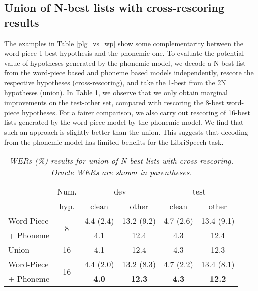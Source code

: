\documentclass[a4paper]{article}
\begin{document}
\subsection{Union of N-best lists with cross-rescoring results}
\vspace{-1mm}
The examples in Table \ref{plg_vs_wp} show some complementarity between the word-piece 1-best hypothesis
and the phonemic one.
To evaluate the potential value of hypotheses generated by the phonemic model, 
we decode a N-best list from the word-piece based and phoneme based models independently,
rescore the respective hypotheses (cross-rescoring), and take the 1-best from the 2N hypotheses (union).
In Table \ref{tab:union}, we observe that we only obtain marginal improvements on the test-other set, compared with rescoring the 8-best
word-piece hypotheses. For a fairer comparison, we also carry out rescoring of 16-best lists generated by
the word-piece model by the phonemic model. We find that such an approach is slightly better than the union.
This suggests that decoding from the phonemic model has limited benefits for the LibriSpeech task.
	\vspace{-1mm}
\begin{table}[h]
	\centering
	\setlength{\tabcolsep}{0.3em}
\vspace{-2mm}
	\caption{\it WERs (\%) results for union of N-best lists with
		cross-rescoring. Oracle WERs are shown in parentheses.}
	\vspace{-3mm}
	\label{tab:union}
\begin{tabular}{ |l|c|c|c|c|c|} \hline
			\multirow{2}{*}{ } & Num.  & \multicolumn{2}{|c|}{dev} & \multicolumn{2}{|c|}{test}    \\ \cline{3-6}
			& hyp.  & clean & other & clean & other    \\ \hline
			Word-Piece      & \multirow{2}{*}{8} & 4.4 (2.4) & 13.2 (9.2) & 4.7 (2.6) & 13.4 (9.1) \\
+ Phoneme      &   & 4.1 & 12.4 & 4.3 & 12.4 \\ \cline{2-6}
			Union     & 16 & 4.1 & 12.4 & 4.3 & 12.3 \\ \hline
			Word-Piece     & \multirow{2}{*}{16} & 4.4 (2.0) & 13.2 (8.3) & 4.7 (2.2) & 13.4 (8.1)   \\ 
+ Phoneme      &  & \textbf{4.0} & \textbf{12.3} & \textbf{4.3} &  \textbf{12.2}   \\ \hline
			
			
		\end{tabular}
\end{table}
 \vspace{-4mm}
\end{document}
